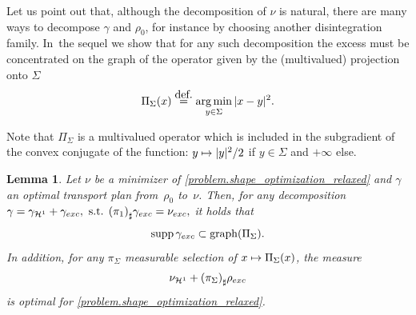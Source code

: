 \documentclass[11pt]{article}
\numberwithin{equation}{section}
\newcommand\mto{\mathchoice{\longmapsto}{\mapsto}{\mapsto}{\mapsto}}
\newtheorem{lemma}[theorem]{Lemma}
\theoremstyle{definition}
\newcommand{\eqdef}{\ensuremath{\stackrel{\mbox{\upshape\tiny def.}}{=}}}
\newcommand\cH{\mathcal{H}}
\DeclareMathOperator*{\argmin}{arg\,min}
\DeclareMathOperator{\supp}{supp}
\newcommand{\nuexc}{\nu_{\textup{exc}}}
\newcommand{\nuH}{\nu_{\cH^1}}
\newcommand{\rhoexc}{\rho_{\textup{exc}}}
\newcommand{\gammaexc}{\gamma_{\textup{exc}}}
\newcommand{\gammaH}{\gamma_{\cH^1}}
\begin{document}
Let us point out that, although the decomposition of $\nu$ is natural, there are many ways to decompose $\gamma$ and $\rho_0$, for instance by choosing another disintegration family. In~the sequel we show that for any such decomposition the excess must be concentrated on the graph of the operator given by the (multivalued) projection onto $\Sigma$
\begin{equation}\label{projection_operator}
\Pi_\Sigma(x) \eqdef \argmin_{y \in \Sigma} |x - y|^2.
\end{equation}

Note that $\Pi_\Sigma$ is a multivalued operator which is included in the subgradient of the convex conjugate of the function:
$y\mto |y|^2/2$ if $y\in \Sigma$ and $+\infty$ else.
\begin{lemma}\label{lemma.minimal_distance2Sigma}
Let $\nu$ be a minimizer of \eqref{problem.shape_optimization_relaxed} and $\gamma$ an optimal transport plan from~$\rho_0$ to~$\nu$. Then, for any decomposition
$
\gamma =
\gammaH+ \gammaexc,
\text{ s.t. }
{(\pi_{1})}_\sharp \gammaexc = \nuexc,
$
it holds that\vspace*{-3pt}
\begin{equation}
\supp \gammaexc \subset \mathrm{graph}(\Pi_\Sigma).\label{eqgammaexcproj}
\end{equation}
In addition, for any $\pi_\Sigma$ measurable selection of $x\mto \Pi_\Sigma(x)$, the measure\vspace*{-3pt}
\[
\nuH + {(\pi_{\Sigma})}_\sharp\rhoexc
\]
is optimal for \eqref{problem.shape_optimization_relaxed}.
\end{lemma}
\end{document}
